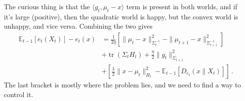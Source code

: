 \documentclass{article}
\theoremstyle{plain}
\theoremstyle{definition}
\theoremstyle{plain}
\newcommand{\tr}{\operatorname{tr}}
\newcommand{\E}{\mathbb E}
\begin{document}
The curious thing is that the $\langle g_t, \mu_t-x\rangle$ term is present in both worlds,
and if it's large (positive), then the quadratic world is happy, but the convex world is unhappy, and vice versa.
Combining the two gives
\begin{align}
    \E_{t-1}[e_t(X_t)] - e_t(x)
     & =
    \frac{1}{2\eta}
    \left[
    \| \mu_t-x\|_{\Sigma_{t}^{-1}}^2
    - \| \mu_{t+1}-x\|_{\Sigma_{t+1}^{-1}}^2
    \right]                                          \\
     & +\tr(\Sigma_t H_t)
    + \frac{\eta}{2} \|g_t\|_{\Sigma_{t+1}}^2        \\
     & + \left[\frac{\lambda}{2} \|x-\mu_t\|_{H_t}^2
    - \E_{t-1}[D_{e_t}(x\|X_t)]\right]\,.
\end{align}
The last bracket is mostly where the problem lies, and we need to find a way to control it.
\end{document}
